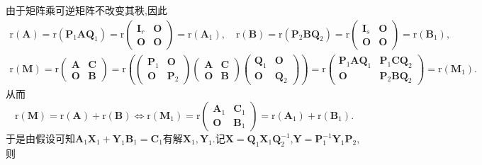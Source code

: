 \documentclass[../../main.tex]{subfiles}%
\begin{document}
\begin{note}
由于矩阵乘可逆矩阵不改变其秩,因此
\begin{gather*}
\mathrm{r}(\boldsymbol{A})=\mathrm{r}(\boldsymbol{P}_1\boldsymbol{AQ}_1)=\mathrm{r}\begin{pmatrix}
\boldsymbol{I}_r & \boldsymbol{O} \\
\boldsymbol{O} & \boldsymbol{O}
\end{pmatrix}=\mathrm{r}(\boldsymbol{A}_1),\quad
\mathrm{r}(\boldsymbol{B})=\mathrm{r}(\boldsymbol{P}_2\boldsymbol{BQ}_2)=\mathrm{r}\begin{pmatrix}
\boldsymbol{I}_s & \boldsymbol{O} \\
\boldsymbol{O} & \boldsymbol{O}
\end{pmatrix}=\mathrm{r}(\boldsymbol{B}_1),
\\
\mathrm{r}(\boldsymbol{M})=\mathrm{r}\begin{pmatrix}
\boldsymbol{A} & \boldsymbol{C} \\
\boldsymbol{O} & \boldsymbol{B}
\end{pmatrix}=\mathrm{r}\left(\begin{pmatrix}
\boldsymbol{P}_1 & \boldsymbol{O} \\
\boldsymbol{O} & \boldsymbol{P}_2
\end{pmatrix}\begin{pmatrix}
\boldsymbol{A} & \boldsymbol{C} \\
\boldsymbol{O} & \boldsymbol{B}
\end{pmatrix}\begin{pmatrix}
\boldsymbol{Q}_1 & \boldsymbol{O} \\
\boldsymbol{O} & \boldsymbol{Q}_2
\end{pmatrix}\right)
=\mathrm{r}\begin{pmatrix}
\boldsymbol{P}_1\boldsymbol{AQ}_1 & \boldsymbol{P}_1\boldsymbol{CQ}_2 \\
\boldsymbol{O} & \boldsymbol{P}_2\boldsymbol{BQ}_2
\end{pmatrix}=\mathrm{r}(\boldsymbol{M}_1).
\end{gather*}
从而
\[
\mathrm{r}(\boldsymbol{M})=\mathrm{r}(\boldsymbol{A})+\mathrm{r}(\boldsymbol{B})\Leftrightarrow\mathrm{r}(\boldsymbol{M}_1)=\mathrm{r}\begin{pmatrix}
\boldsymbol{A}_1 & \boldsymbol{C}_1 \\
\boldsymbol{O} & \boldsymbol{B}_1
\end{pmatrix}=\mathrm{r}(\boldsymbol{A}_1)+\mathrm{r}(\boldsymbol{B}_1).
\]
于是由假设可知\(\boldsymbol{A}_1\boldsymbol{X}_1+\boldsymbol{Y}_1\boldsymbol{B}_1=\boldsymbol{C}_1\)有解\(\boldsymbol{X}_1,\boldsymbol{Y}_1\).记\(\boldsymbol{X}=\boldsymbol{Q}_1\boldsymbol{X}_1\boldsymbol{Q}_{2}^{-1}\),\(\boldsymbol{Y}=\boldsymbol{P}_{1}^{-1}\boldsymbol{Y}_1\boldsymbol{P}_2\),则

\end{note}
\end{document}
